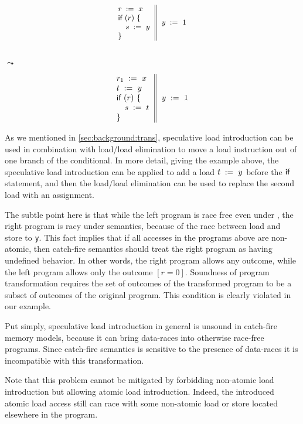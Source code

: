 \begin{minipage}{0.43\linewidth}
\begin{equation*}
\small
\inarrII{
  \readInst{}{r}{x}      \\
  \kw{if} {(r)} ~\{      \\
  \quad\readInst{}{s}{y} \\
  \}

}{
  \writeInst{}{y}{1}       \\
}
\label{ex:sliA}
\end{equation*}
\end{minipage}\hfill%
\begin{minipage}{0.09\linewidth}
\Large~\\ $\leadsto$
\end{minipage}\hfill%
\begin{minipage}{0.43\linewidth}
\begin{equation*}
\inarrII{
  \readInst{}{r_1}{x}      \\
  \readInst{}{t}{y}        \\
  \kw{if} {(r)} ~\{        \\
  \quad\assignInst{s}{t}   \\
  \}

}{
  \writeInst{}{y}{1}       \\
}
\label{ex:sliB}
\end{equation*}
\end{minipage}
 
As we mentioned in \cref{sec:background:trans}, 
speculative load introduction can be used 
in combination with load/load elimination 
to move a load instruction out of one branch of the conditional.
In more detail, giving the example above, 
the speculative load introduction can be applied
to add a load $t\;:=_{}\;y$ before the $\textsf{if}~$ statement, 
and then the load/load elimination can be used 
to replace the second load with an assignment. 

The subtle point here is that while the 
left program is race free even under \SC, 
the right program is racy under \SC semantics,
because of the race between load and store to \texttt{y}.
This fact implies that if all accesses in the programs above 
are non-atomic, then catch-fire semantics should 
treat the right program as having undefined behavior.
In other words, the right program allows any outcome,
while the left program allows only the outcome ${[r=0]}$.
Soundness of program transformation requires 
the set of outcomes of the transformed program 
to be a subset of outcomes of the original program. 
This condition is clearly violated in our example. 

Put simply, speculative load introduction in general
is unsound in catch-fire memory models, 
because it can bring data-races into otherwise 
race-free programs. Since catch-fire semantics
is sensitive to the presence of data-races 
it is incompatible with this transformation. 

Note that this problem cannot be mitigated 
by forbidding non-atomic load introduction
but allowing atomic load introduction. 
Indeed, the introduced atomic load access still 
can race with some non-atomic load or store
located elsewhere in the program.  
